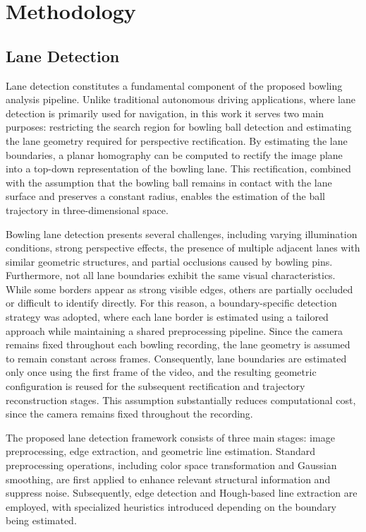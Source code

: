 \section{Methodology}


\subsection{Lane Detection}

Lane detection constitutes a fundamental component of the proposed bowling analysis pipeline. Unlike traditional autonomous driving applications, where lane detection is primarily used for navigation, in this work it serves two main purposes: restricting the search region for bowling ball detection and estimating the lane geometry required for perspective rectification. By estimating the lane boundaries, a planar homography can be computed to rectify the image plane into a top-down representation of the bowling lane. This rectification, combined with the assumption that the bowling ball remains in contact with the lane surface and preserves a constant radius, enables the estimation of the ball trajectory in three-dimensional space.

Bowling lane detection presents several challenges, including varying illumination conditions, strong perspective effects, the presence of multiple adjacent lanes with similar geometric structures, and partial occlusions caused by bowling pins. Furthermore, not all lane boundaries exhibit the same visual characteristics. While some borders appear as strong visible edges, others are partially occluded or difficult to identify directly. For this reason, a boundary-specific detection strategy was adopted, where each lane border is estimated using a tailored approach while maintaining a shared preprocessing pipeline.
Since the camera remains fixed throughout each bowling recording, the lane geometry is assumed to remain constant across frames. Consequently, lane boundaries are estimated only once using the first frame of the video, and the resulting geometric configuration is reused for the subsequent rectification and trajectory reconstruction stages. This assumption substantially reduces computational cost, since the camera remains fixed throughout the recording.

The proposed lane detection framework consists of three main stages: image preprocessing, edge extraction, and geometric line estimation. Standard preprocessing operations, including color space transformation and Gaussian smoothing, are first applied to enhance relevant structural information and suppress noise. Subsequently, edge detection and Hough-based line extraction are employed, with specialized heuristics introduced depending on the boundary being estimated.




